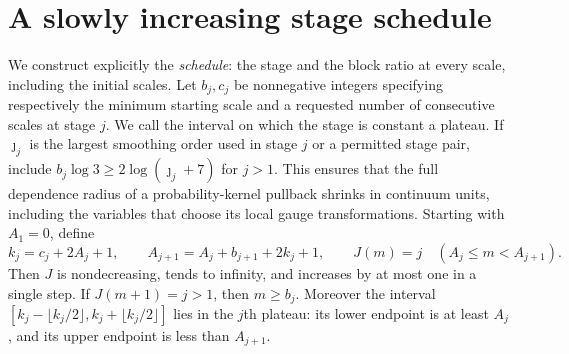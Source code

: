 \section{A slowly increasing stage schedule}
\label{ch10:schedule}

We construct explicitly the \emph{schedule}: the stage and the block ratio at every scale, including the initial scales.
Let $b_j,c_j$ be nonnegative integers specifying respectively the
minimum starting scale and a requested number of consecutive scales at
stage $j$. We call the interval on which the stage is constant a plateau.
If $\jmath_j$ is the largest smoothing order used in stage $j$ or a
permitted stage pair, include
$b_j\log3\ge2\log(\jmath_j+7)$ for $j>1$. This ensures that
the full dependence radius of a probability-kernel pullback shrinks in
continuum units, including the variables that choose its local gauge transformations.
Starting with $A_1=0$, define
\[
 k_j=c_j+2A_j+1,\qquad
 A_{j+1}=A_j+b_{j+1}+2k_j+1,
 \qquad J(m)=j\quad(A_j\le m<A_{j+1}).
\]
Then $J$ is nondecreasing, tends to infinity, and increases by at
most one in a single step. If $J(m+1)=j>1$, then $m\ge b_j$.
Moreover the interval
$[k_j-\lfloor k_j/2\rfloor,k_j+\lfloor k_j/2\rfloor]$
lies in the $j$th plateau: its lower endpoint is at least $A_j$,
and its upper endpoint is less than $A_{j+1}$.

